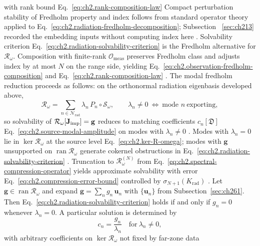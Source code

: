 with rank bound Eq.~\eqref{eq:ch2.rank-composition-law}
Compact perturbation stability of Fredholm property and index follows from standard operator
theory applied to Eq.~\eqref{eq:ch2.radiation-fredholm-decomposition}; Subsection
~\ref{sec:ch213} recorded the embedding inputs without computing index here
\cite{stratton1941}. Solvability criterion
Eq.~\eqref{eq:ch2.radiation-solvability-criterion} is the Fredholm alternative for
\(\mathcal{R}_\omega\). Composition with finite-rank \(\mathcal{O}_{\mathrm{meas}}\) preserves
Fredholm class and adjusts index by at most \(N\) on the range side, yielding
Eq.~\eqref{eq:ch2.observation-fredholm-composition} and
Eq.~\eqref{eq:ch2.rank-composition-law} \cite{stratton1941}.
The modal fredholm reduction proceeds as follows: on the orthonormal radiation eigenbasis developed above,
\begin{equation}
\label{eq:ch2.modal-fredholm-reduction}
\mathcal{R}_\omega
=
\sum_{n\in\mathcal{N}_{\mathrm{rad}}}
\lambda_n\,P_n\circ\mathcal{S}_\omega,
\qquad
\lambda_n\neq 0
\ \Longleftrightarrow\
\text{mode }n\ \text{exporting},
\end{equation}
so solvability of \(\mathcal{R}_\omega[\mathbf{J}_{\mathrm{imp}}]=\mathbf{g}\) reduces to matching coefficients
\(c_n[\mathfrak{D}]\) Eq.~\eqref{eq:ch2.source-modal-amplitude} on modes with
\(\lambda_n\neq 0\) \cite{stratton1941}. Modes with \(\lambda_n=0\) lie in
\(\ker\mathcal{R}_\omega\) at the source level Eq.~\eqref{eq:ch2.ker-R-omega}; modes
with \(\mathbf{g}\) unsupported on \(\operatorname{ran}\mathcal{R}_\omega\) generate cokernel
obstructions in Eq.~\eqref{eq:ch2.radiation-solvability-criterion}
\cite{stratton1941}. Truncation to \(\mathcal{R}_\omega^{(N)}\) from
Eq.~\eqref{eq:ch2.spectral-compression-operator} yields approximate solvability with error
Eq.~\eqref{eq:ch2.compression-error-bound} controlled by \(\sigma_{N+1}(K_{\mathrm{rad}})\)
\cite{harrington2001}. \phantomsection\label{prop:ch2.modal-invertibility-equivalence}
Let \(\mathbf{g}\in\operatorname{ran}\mathcal{R}_\omega\) and expand
\(\mathbf{g}=\sum_n g_n\,\mathbf{u}_n\) with \(\{\mathbf{u}_n\}\) from
Subsection~\ref{sec:ch261}. Then Eq.~\eqref{eq:ch2.radiation-solvability-criterion} holds if
and only if \(g_n=0\) whenever \(\lambda_n=0\). A particular solution is determined by
\begin{equation}
\label{eq:ch2.modal-particular-solution}
c_n
=
\frac{g_n}{\lambda_n}
\quad\text{for}\ \lambda_n\neq 0,
\end{equation}
with arbitrary coefficients on \(\ker\mathcal{R}_\omega\) not fixed by far-zone data
